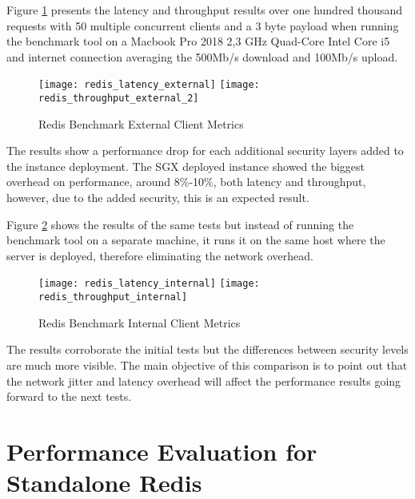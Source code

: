 Figure \ref{fig:redis_benchmark_external_metrics} presents the latency and throughput results over one hundred thousand requests with 50 multiple concurrent clients and a 3 byte payload when running the benchmark tool on a Macbook Pro 2018 2,3 GHz Quad-Core Intel Core i5 and internet connection averaging the 500Mb/s download and 100Mb/s upload.

\begin{figure}[htbp]
  \centering
    {\texttt{[image: redis\_latency\_external]}}%
    {\texttt{[image: redis\_throughput\_external\_2]}}%
  \caption{Redis Benchmark External Client Metrics}
  \label{fig:redis_benchmark_external_metrics}
\end{figure}

The results show a performance drop for each additional security layers added to the instance deployment. The \gls{SGX} deployed instance showed the biggest overhead on performance, around 8\%-10\%, both latency and throughput, however, due to the added security, this is an expected result.

Figure \ref{fig:redis_benchmark_internal_metrics} shows the results of the same tests but instead of running the benchmark tool on a separate machine, it runs it on the same host where the server is deployed, therefore eliminating the network overhead.

\begin{figure}[htbp]
  \centering
    {\texttt{[image: redis\_latency\_internal]}}%
    {\texttt{[image: redis\_throughput\_internal]}}%
  \caption{Redis Benchmark Internal Client Metrics}
  \label{fig:redis_benchmark_internal_metrics}
\end{figure}

The results corroborate the initial tests but the differences between security levels are much more visible. The main objective of this comparison is to point out that the network jitter and latency overhead will affect the performance results going forward to the next tests.

\section{Performance Evaluation for Standalone Redis}
\label{sec:performance_evaluation_standalone_redis}


